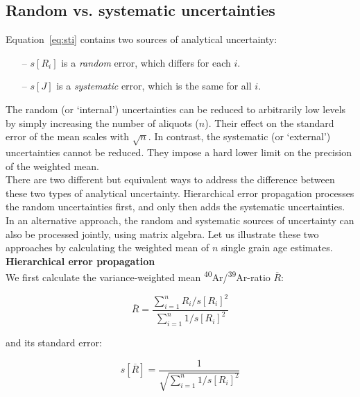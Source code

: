 \documentclass{article}
\begin{document}
\subsection{Random vs. systematic uncertainties}
\label{sec:randomVSsystmatic}

Equation~\ref{eq:sti} contains two sources of analytical uncertainty:

\begin{itemize}
\item[--] $s[R_i]$ is a \emph{random} error, which differs for each $i$.
\item[--] $s[J]$ is a \emph{systematic} error, which is the same for
  all $i$.
\end{itemize}

The random (or `internal') uncertainties can be reduced to arbitrarily
low levels by simply increasing the number of aliquots ($n$).  Their
effect on the standard error of the mean scales with $\sqrt{n}$. In
contrast, the systematic (or `external') uncertainties cannot be
reduced. They impose a hard lower limit on the precision of the
weighted mean.\\

There are two different but equivalent ways to address the difference
between these two types of analytical uncertainty. Hierarchical error
propagation \citep{renne1998, min2000} processes the random
uncertainties first, and only then adds the systematic
uncertainties. In an alternative approach, the random and systematic
sources of uncertainty can also be processed jointly, using matrix
algebra. Let us illustrate these two approaches by calculating the
weighted mean of $n$ single grain age estimates.\\

\noindent\textbf{Hierarchical error propagation}\\

We first calculate the variance-weighted mean
\textsuperscript{40}Ar/\textsuperscript{39}Ar-ratio $\overline{R}$:

\begin{equation}
  \overline{R} = \frac{\sum_{i=1}^n R_i/s[R_i]^2}{\sum_{i=1}^n 1/s[R_i]^2}
  \label{eq:Rbar}
\end{equation}

\noindent and its standard error:

\begin{equation}
  s[\overline{R}] = \frac{1}{\sqrt{\sum_{i=1}^n 1/s[R_i]^2}}
  \label{eq:sRbar}
\end{equation}
\end{document}
